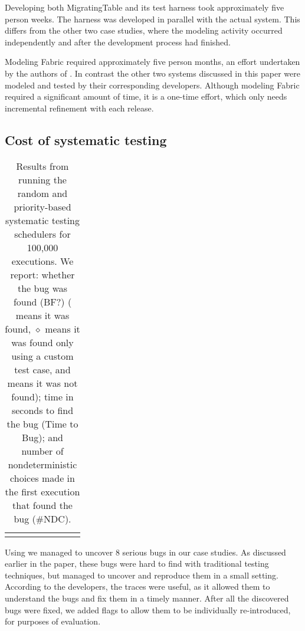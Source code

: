 Developing both MigratingTable and its \psharp test harness took approximately five person weeks. The harness was developed in parallel with the actual system. This differs from the other two case studies, where the modeling activity occurred independently and after the development process had finished.

Modeling Fabric required approximately five person months, an effort undertaken by the authors of \psharp. In contrast the other two systems discussed in this paper were modeled and tested by their corresponding developers. Although modeling Fabric required a significant amount of time, it is a one-time effort, which only needs incremental refinement with each release.

\subsection{Cost of systematic testing}
\label{sec:eval:machine_cost}

\setlength{\tabcolsep}{.68em}
\begin{table*}[t]
\small
\centering
\begin{tabular}{rl rrr rrr}
\centering

\end{tabular}
\caption{Results from running the \psharp random and priority-based systematic testing schedulers for 100,000 executions. We report: whether the bug was found (BF?) (\cmark\xspace means it was found, $\diamond$\xspace means it was found only using a custom test case, and \xmark\xspace means it was not found); time in seconds to find the bug (Time to Bug); and number of nondeterministic choices made in the first execution that found the bug (\#NDC).}
\label{tab:testing}
\end{table*}

Using \psharp we managed to uncover 8 serious bugs in our case studies. As discussed earlier in the paper, these bugs were hard to find with traditional testing techniques, but \psharp managed to uncover and reproduce them in a small setting. According to the developers, the \psharp traces were useful, as it allowed them to understand the bugs and fix them in a timely manner. After all the discovered bugs were fixed, we added flags to allow them to be individually re-introduced, for purposes of evaluation.

